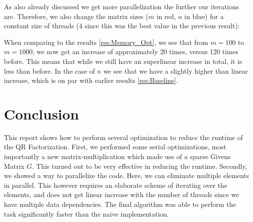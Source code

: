 \documentclass[a4paper]{scrartcl}
\begin{document}
        As also already discussed we get more parallelization the further our
        iterations are. Therefore, we also change the matrix sizes ($m$ in red,
        $n$ in blue) for a constant size of threads (4 since this was the best
        value in the previous result):\\



        When comparing to the results \ref{res:Memory_Opt}, we see that from
        $m=100$ to $m=1000$, we now get an increase of approximately 20 times,
        versus 120 times before. This means that while we still have an
        superlinear increase in total, it is less than before. In the case of
        $n$ we see that we have a slightly higher than linear increase, which is
        on par with earlier results \ref{res:Baseline}.
        
\section{Conclusion}
    This report shows how to perform several optimization to reduce the runtime
    of the QR Factorization. First, we performed some serial optimizations, most
    importantly a new matrix-multiplication which made use of a sparse Givens
    Matrix $G$. This turned out to be very effective in reducing the runtime.
    Secondly, we showed a way to parallelize the code. Here, we can eliminate
    multiple elements in parallel. This however requires an elaborate scheme of
    iterating over the elements, and does not get linear increase with the
    number of threads since we have multiple data dependencies. The final
    algorithm was able to perform the task significantly faster than the naive
    implementation.
\end{document}
